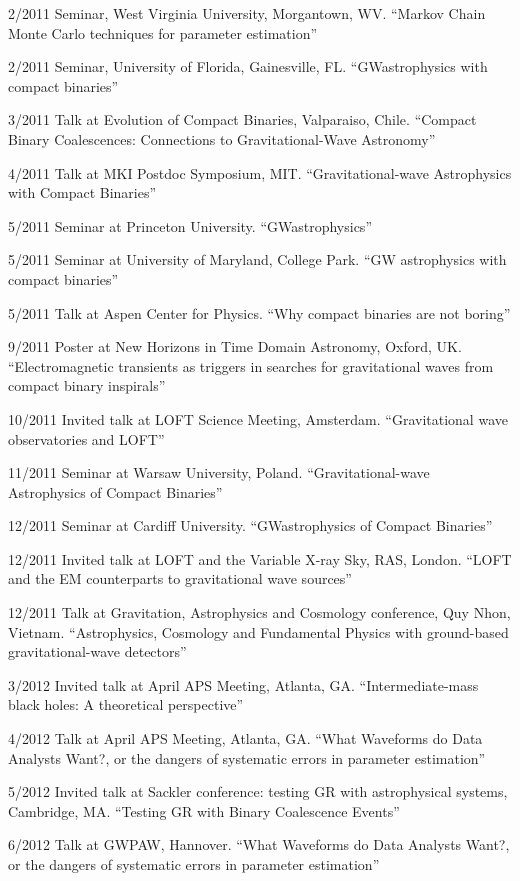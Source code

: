 \documentclass[margin,line]{res}
\begin{document}
\begin{resume}
2/2011 	Seminar, West Virginia University, Morgantown, WV. 	``Markov Chain Monte Carlo techniques for parameter estimation''

2/2011 	Seminar, University of Florida, Gainesville, FL. 	``GWastrophysics with compact binaries''

3/2011 	Talk at Evolution of Compact Binaries, Valparaiso, Chile. 	``Compact Binary Coalescences: Connections to Gravitational-Wave Astronomy'' 

4/2011 	Talk 	at MKI Postdoc Symposium, MIT. 	``Gravitational-wave Astrophysics with Compact Binaries''

5/2011 	Seminar 	at Princeton University.	``GWastrophysics''

5/2011 	Seminar 	at University of Maryland, College Park. 	``GW astrophysics with compact binaries''

5/2011 	Talk at Aspen Center for Physics. 	``Why compact binaries are not boring''

9/2011	Poster at New Horizons in Time Domain Astronomy, Oxford, UK.  ``Electromagnetic transients as triggers in searches for gravitational waves from compact binary inspirals''

10/2011	Invited talk at LOFT Science Meeting, Amsterdam. ``Gravitational wave observatories and LOFT''

11/2011	Seminar at Warsaw University, Poland. ``Gravitational-wave Astrophysics of Compact Binaries''

12/2011	Seminar at Cardiff University. 	``GWastrophysics of Compact Binaries''

12/2011	Invited talk at LOFT and the Variable X-ray Sky, RAS, London. ``LOFT and the EM counterparts to gravitational wave sources''

12/2011	Talk at Gravitation, Astrophysics and Cosmology conference, Quy Nhon, Vietnam.  ``Astrophysics, Cosmology and Fundamental Physics with ground-based gravitational-wave detectors''

3/2012 	Invited talk at April APS Meeting, Atlanta, GA. 	``Intermediate-mass black holes: A theoretical perspective''

4/2012 	Talk 	at April APS Meeting, Atlanta, GA.  ``What Waveforms do Data Analysts Want?, or the dangers of systematic errors in parameter estimation''

5/2012 	Invited talk at Sackler conference: testing GR with astrophysical systems, Cambridge, MA. 	``Testing GR with Binary Coalescence Events''

6/2012 	Talk 	at GWPAW, Hannover.  ``What Waveforms do Data Analysts Want?, or the dangers of systematic errors in parameter estimation''


\end{resume}
\end{document}
